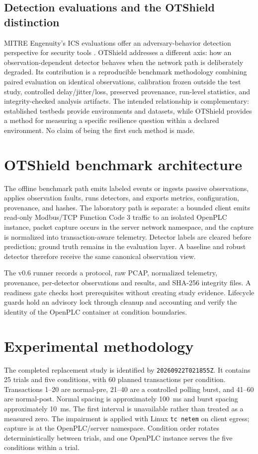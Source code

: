 \documentclass[11pt]{article}
\newcommand{\fc}{Modbus/TCP Function Code 3}
\begin{document}
\subsection{Detection evaluations and the OTShield distinction}
MITRE Engenuity's ICS evaluations offer an adversary-behavior detection
perspective for security tools \cite{mitre2021ics}. OTShield addresses a
different axis: how an observation-dependent detector behaves when the network
path is deliberately degraded. Its contribution is a reproducible benchmark
methodology combining paired evaluation on identical observations, calibration
frozen outside the test study, controlled delay/jitter/loss, preserved provenance,
run-level statistics, and integrity-checked analysis artifacts. The intended
relationship is complementary: established testbeds provide environments and
datasets, while OTShield provides a method for measuring a specific resilience
question within a declared environment. No claim of being the first such method
is made.

\section{OTShield benchmark architecture}
The offline benchmark path emits labeled events or ingests passive observations,
applies observation faults, runs detectors, and exports metrics, configuration,
provenance, and hashes. The laboratory path is separate: a bounded client emits
read-only \fc{} traffic to an isolated OpenPLC instance, packet capture occurs in
the server network namespace, and the capture is normalized into transaction-aware
telemetry. Detector labels are cleared before prediction; ground truth remains in
the evaluation layer. A baseline and robust detector therefore receive the same
canonical observation view.

The v0.6 runner records a protocol, raw PCAP, normalized telemetry, provenance,
per-detector observations and results, and SHA-256 integrity files. A readiness
gate checks host prerequisites without creating study evidence. Lifecycle guards
hold an advisory lock through cleanup and accounting and verify the identity of
the OpenPLC container at condition boundaries.

\section{Experimental methodology}
The completed replacement study is identified by \texttt{20260922T021855Z}.
It contains 25 trials and five conditions, with 60 planned transactions per
condition. Transactions 1--20 are normal-pre, 21--40 are a controlled polling
burst, and 41--60 are normal-post. Normal spacing is approximately 100~ms and
burst spacing approximately 10~ms. The first interval is unavailable rather than
treated as a measured zero. The impairment is applied with Linux \texttt{tc
netem} on client egress; capture is at the OpenPLC/server namespace. Condition
order rotates deterministically between trials, and one OpenPLC instance serves
the five conditions within a trial.
\end{document}
